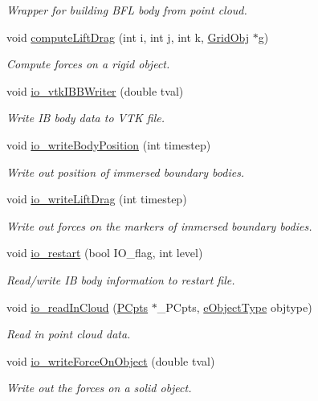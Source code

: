 \begin{DoxyCompactItemize}
\begin{DoxyCompactList}\small\item\em Wrapper for building B\+FL body from point cloud. \end{DoxyCompactList}\item 
void \hyperlink{class_object_manager_a6a35b34d77e7cd56060a6953d0d0860a}{compute\+Lift\+Drag} (int i, int j, int k, \hyperlink{class_grid_obj}{Grid\+Obj} $\ast$g)
\begin{DoxyCompactList}\small\item\em Compute forces on a rigid object. \end{DoxyCompactList}\item 
void \hyperlink{class_object_manager_a9bcee530acc6e99f80a53d7ddb757989}{io\+\_\+vtk\+I\+B\+B\+Writer} (double tval)
\begin{DoxyCompactList}\small\item\em Write IB body data to V\+TK file. \end{DoxyCompactList}\item 
void \hyperlink{class_object_manager_aca1fa71a37c8e02ebe40fdc932350c15}{io\+\_\+write\+Body\+Position} (int timestep)
\begin{DoxyCompactList}\small\item\em Write out position of immersed boundary bodies. \end{DoxyCompactList}\item 
void \hyperlink{class_object_manager_a7f3c0860b78203671cd858532492555d}{io\+\_\+write\+Lift\+Drag} (int timestep)
\begin{DoxyCompactList}\small\item\em Write out forces on the markers of immersed boundary bodies. \end{DoxyCompactList}\item 
void \hyperlink{class_object_manager_aaa1b7e2a3392c2a8d85606041b986b4d}{io\+\_\+restart} (bool I\+O\+\_\+flag, int level)
\begin{DoxyCompactList}\small\item\em Read/write IB body information to restart file. \end{DoxyCompactList}\item 
void \hyperlink{class_object_manager_a5c11d747c3df9e91d5fc2dac836d7b7e}{io\+\_\+read\+In\+Cloud} (\hyperlink{class_p_cpts}{P\+Cpts} $\ast$\+\_\+\+P\+Cpts, \hyperlink{_object_manager_8h_a7b78fa3db30dfb9c1efc82bf886fe184}{e\+Object\+Type} objtype)
\begin{DoxyCompactList}\small\item\em Read in point cloud data. \end{DoxyCompactList}\item 
void \hyperlink{class_object_manager_adf65260d81584613fa33f2e7658f1b36}{io\+\_\+write\+Force\+On\+Object} (double tval)
\begin{DoxyCompactList}\small\item\em Write out the forces on a solid object. \end{DoxyCompactList}\end{DoxyCompactItemize}
